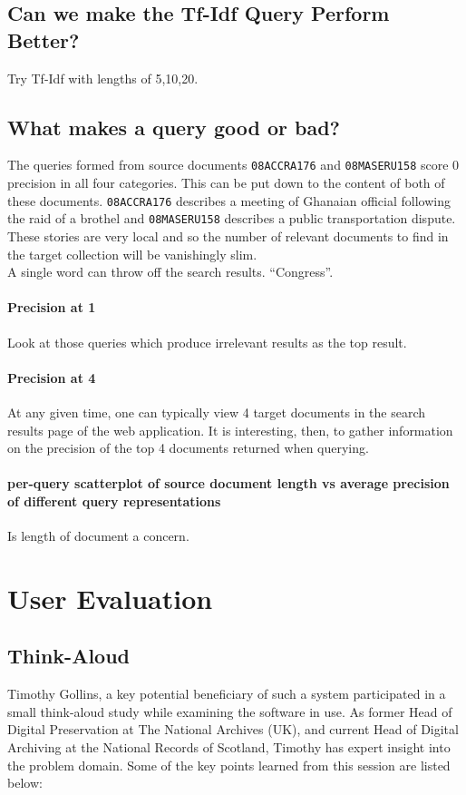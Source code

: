 \documentclass{l4proj}
\newcommand{\code}[1]{\texttt{#1}}
\begin{document}
\subsection{Can we make the Tf-Idf Query Perform Better?}
Try Tf-Idf with lengths of 5,10,20.
\subsection{What makes a query good or bad?}
The queries formed from source documents \code{08ACCRA176} and \code{08MASERU158} score 0 precision in all four categories. This can be put down to the content of both of these documents. \code{08ACCRA176} describes a meeting of Ghanaian official following the raid of a brothel and \code{08MASERU158} describes a public transportation dispute. These stories are very local and so the number of relevant documents to find in the target collection will be vanishingly slim. \\
A single word can throw off the search results. ``Congress''. \\
\paragraph{Precision at 1}
Look at those queries which produce irrelevant results as the top result.
\paragraph{Precision at 4}
At any given time, one can typically view 4 target documents in the search results page of the web application. It is interesting, then, to gather information on the precision of the top 4 documents returned when querying.
\paragraph{per-query scatterplot of source document length vs average precision of different query representations} Is length of document a concern.

\section{User Evaluation} \label{userevaluation}
\subsection{Think-Aloud}
Timothy Gollins, a key potential beneficiary of such a system participated in a small think-aloud study while examining the software in use. As former Head of Digital Preservation at The National Archives (UK), and current Head of Digital Archiving at the National Records of Scotland, Timothy has expert insight into the problem domain.
Some of the key points learned from this session are listed below:
\end{document}
